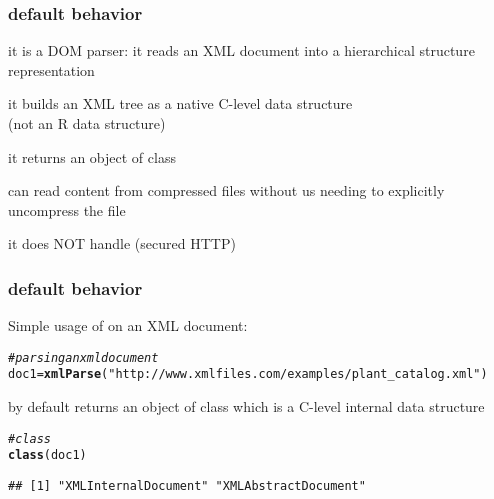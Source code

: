\documentclass[12pt]{beamer}\usepackage[]{graphicx}\usepackage[]{color}
\makeatletter
\newcommand{\hlstr}[1]{\textcolor[rgb]{0.192,0.494,0.8}{#1}}%
\newcommand{\hlcom}[1]{\textcolor[rgb]{0.678,0.584,0.686}{\textit{#1}}}%
\newcommand{\hlstd}[1]{\textcolor[rgb]{0.345,0.345,0.345}{#1}}%
\newcommand{\hlkwb}[1]{\textcolor[rgb]{0.69,0.353,0.396}{#1}}%
\newcommand{\hlkwd}[1]{\textcolor[rgb]{0.737,0.353,0.396}{\textbf{#1}}}%
\newenvironment{kframe}{%
 \def\at@end@of@kframe{}%
 \ifinner\ifhmode%
  \def\at@end@of@kframe{\end{minipage}}%
  \begin{minipage}{\columnwidth}%
 \fi\fi%
 \def\FrameCommand##1{\hskip\@totalleftmargin \hskip-\fboxsep
 \colorbox{shadecolor}{##1}\hskip-\fboxsep
     \hskip-\linewidth \hskip-\@totalleftmargin \hskip\columnwidth}%
 \MakeFramed {\advance\hsize-\width
   \@totalleftmargin\z@ \linewidth\hsize
   \@setminipage}}%
 {\par\unskip\endMakeFramed%
 \at@end@of@kframe}
\newenvironment{knitrout}{}{} %
\makeatother
\begin{document}

\begin{frame}
\frametitle{}
\begin{center}
\end{center}
\end{frame}


\begin{frame}[fragile]
\frametitle{ default behavior}

\bi
 \item it is a DOM parser: it reads an XML document into a hierarchical structure representation
 \item it builds an XML tree as a native C-level data structure \\
 (not an R data structure)
 \item it returns an object of class {\hilit {}}
 \item can read content from compressed files without us needing to explicitly uncompress the file
 \item it does NOT handle  (secured HTTP)
\ei
\eb

\end{frame}


\begin{frame}[fragile]
\frametitle{ default behavior}

Simple usage of  on an XML document:
\begin{knitrout}\scriptsize
{}\color{fgcolor}\begin{kframe}
\begin{alltt}
\hlcom{# parsing an xml document}
\hlstd{doc1} \hlkwb{=} \hlkwd{xmlParse}\hlstd{(}\hlstr{"http://www.xmlfiles.com/examples/plant_catalog.xml"}\hlstd{)}
\end{alltt}
\end{kframe}
\end{knitrout}

by default  returns an object of class {\hilit {}} which is a C-level internal data structure

\begin{knitrout}\footnotesize
{}\color{fgcolor}\begin{kframe}
\begin{alltt}
\hlcom{# class }
\hlkwd{class}\hlstd{(doc1)}
\end{alltt}
\begin{verbatim}
## [1] "XMLInternalDocument" "XMLAbstractDocument"
\end{verbatim}
\end{kframe}
\end{knitrout}

\end{frame}
\end{document}
